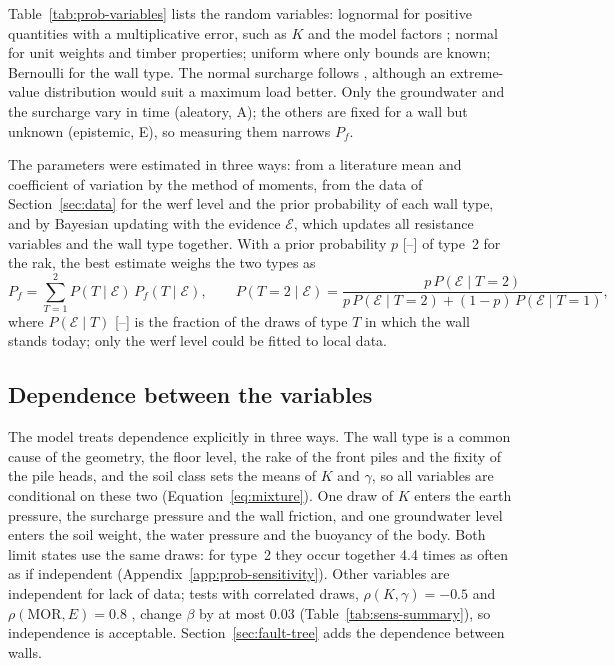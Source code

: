 Table~\ref{tab:prob-variables} lists the random variables: lognormal for
positive quantities with a multiplicative error, such as $K$ and the model
factors \parencite{jcss2001}; normal for unit weights and timber properties;
uniform where only bounds are known; Bernoulli for the wall type. The normal
surcharge follows \textcite{hemel2024}, although an extreme-value distribution
would suit a maximum load better. Only the groundwater and the surcharge vary
in time (aleatory, A); the others are fixed for a wall but unknown (epistemic,
E), so measuring them narrows $P_f$.


The parameters were estimated in three ways: from a literature mean and
coefficient of variation by the method of moments, from the data of
Section~\ref{sec:data} for the werf level and the prior probability of each
wall type, and by Bayesian updating with the evidence $\mathcal{E}$, which updates all
resistance variables and the wall type together. With a prior probability $p$
[--] of type~2 for the rak, the best estimate weighs the two types as
\begin{equation}
P_f = \sum_{T=1}^{2} P(T \mid \mathcal{E})\,P_f(T \mid \mathcal{E}), \qquad
P(T{=}2 \mid \mathcal{E}) = \frac{p\,P(\mathcal{E} \mid T{=}2)}{p\,P(\mathcal{E} \mid T{=}2) + (1-p)\,P(\mathcal{E} \mid T{=}1)},
\label{eq:mixture}
\end{equation}
where $P(\mathcal{E} \mid T)$ [--] is the fraction of the draws of type $T$ in which the
wall stands today; only the werf level could be fitted to local data.

\subsection{Dependence between the variables}\label{sec:prob-dependence}

The model treats dependence explicitly in three ways. The wall type is a
common cause of the geometry, the floor level, the rake of the front piles and
the fixity of the pile heads, and the soil class sets the means of $K$ and
$\gamma$, so all variables are conditional on these two
(Equation~\ref{eq:mixture}). One draw of $K$ enters the earth pressure, the
surcharge pressure and the wall friction, and one groundwater level enters the
soil weight, the water pressure and the buoyancy of the body. Both limit
states use the same draws: for type~2 they occur together 4.4 times as often as
if independent (Appendix~\ref{app:prob-sensitivity}). Other variables are independent for lack of data;
tests with correlated draws, $\rho(K,\gamma) = -0.5$ and
$\rho(\mathrm{MOR},E) = 0.8$ \parencite{jcss2001}, change $\beta$ by at most
0.03 (Table~\ref{tab:sens-summary}), so independence is acceptable. Section~\ref{sec:fault-tree} adds the dependence between
walls.

